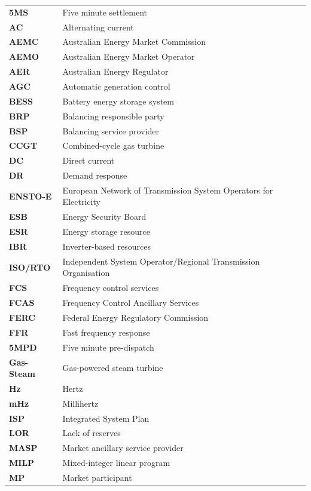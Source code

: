 \documentclass[12pt,a4paper,]{report}
\begin{document}
\begin{longtable}[l]{l l}
\textbf{5MS} & Five minute settlement \\
\textbf{AC} & Alternating current \\
\textbf{AEMC} & Australian Energy Market Commission \\ 
\textbf{AEMO} & Australian Energy Market Operator \\
\textbf{AER} & Australian Energy Regulator \\
\textbf{AGC} & Automatic generation control \\
\textbf{BESS} & Battery energy storage system \\
\textbf{BRP} & Balancing responsible party \\
\textbf{BSP} & Balancing service provider \\
\textbf{CCGT} & Combined-cycle gas turbine \\
\textbf{DC} & Direct current \\
\textbf{DR} & Demand response \\
\textbf{ENSTO-E} & European Network of Transmission System Operators for Electricity \\
\textbf{ESB} & Energy Security Board \\
\textbf{ESR} & Energy storage resource \\
\textbf{IBR} & Inverter-based resources \\
\textbf{ISO/RTO} &  Independent System Operator/Regional Transmission Organisation \\
\textbf{FCS} & Frequency control services \\
\textbf{FCAS} & Frequency Control Ancillary Services \\
\textbf{FERC} & Federal Energy Regulatory Commission \\
\textbf{FFR} & Fast frequency response \\
\textbf{5MPD} & Five minute pre-dispatch \\
\textbf{Gas-Steam} & Gas-powered steam turbine \\
\textbf{Hz} & Hertz \\
\textbf{mHz} & Millihertz \\
\textbf{ISP} & Integrated System Plan \\
\textbf{LOR} & Lack of reserves \\
\textbf{MASP} & Market ancillary service provider \\
\textbf{MILP} & Mixed-integer linear program \\
\textbf{MP} & Market participant \\

\end{longtable}
\end{document}
